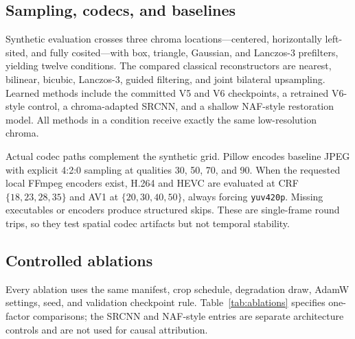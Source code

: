 \documentclass[10pt,twocolumn]{article}
\newcommand{\code}[1]{\texttt{#1}}
\begin{document}
\subsection{Sampling, codecs, and baselines}

Synthetic evaluation crosses three chroma locations---centered, horizontally
left-sited, and fully cosited---with box, triangle, Gaussian, and Lanczos-3
prefilters, yielding twelve conditions.  The compared classical reconstructors
are nearest, bilinear, bicubic, Lanczos-3, guided filtering, and joint bilateral
upsampling.  Learned methods include the committed V5 and V6 checkpoints, a
retrained V6-style control, a chroma-adapted SRCNN, and a shallow NAF-style
restoration model.  All methods in a condition receive exactly the same
low-resolution chroma.

Actual codec paths complement the synthetic grid.  Pillow encodes baseline JPEG
with explicit 4:2:0 sampling at qualities 30, 50, 70, and 90.  When the requested
local FFmpeg encoders exist, H.264 and HEVC are evaluated at CRF
$\{18,23,28,35\}$ and AV1 at $\{20,30,40,50\}$, always forcing
\code{yuv420p}.  Missing executables or encoders produce structured skips.
These are single-frame round trips, so they test spatial codec artifacts but not
temporal stability.

\subsection{Controlled ablations}

Every ablation uses the same manifest, crop schedule, degradation draw, AdamW
settings, seed, and validation checkpoint rule.  Table~\ref{tab:ablations}
specifies one-factor comparisons; the SRCNN and NAF-style entries are separate
architecture controls and are not used for causal attribution.

\begin{table}[t]
  \centering
  \caption{Preregistered V6 ablation matrix.}
  \label{tab:ablations}
\end{table}
\end{document}
